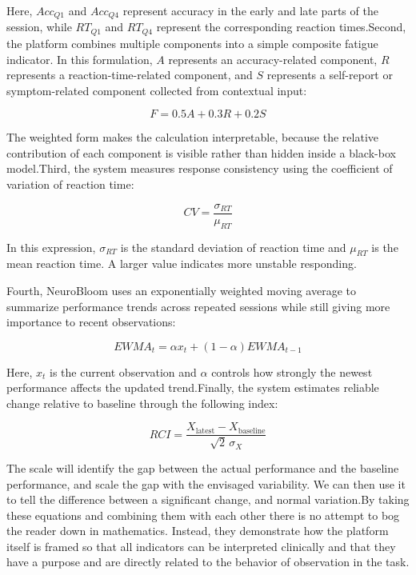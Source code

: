 \documentclass[12pt,a4paper]{report}
\begin{document}
Here, $Acc_{Q1}$ and $Acc_{Q4}$ represent accuracy in the early and late parts of the session, while $RT_{Q1}$ and $RT_{Q4}$ represent the corresponding reaction times.Second, the platform combines multiple components into a simple composite fatigue indicator. In this formulation, $A$ represents an accuracy-related component, $R$ represents a reaction-time-related component, and $S$ represents a self-report or symptom-related component collected from contextual input:

\begin{equation}
F = 0.5A + 0.3R + 0.2S
\end{equation}

The weighted form makes the calculation interpretable, because the relative contribution of each component is visible rather than hidden inside a black-box model.Third, the system measures response consistency using the coefficient of variation of reaction time:

\begin{equation}
CV = \frac{\sigma_{RT}}{\mu_{RT}}
\end{equation}

In this expression, $\sigma_{RT}$ is the standard deviation of reaction time and $\mu_{RT}$ is the mean reaction time. A larger value indicates more unstable responding.

Fourth, NeuroBloom uses an exponentially weighted moving average to summarize performance trends across repeated sessions while still giving more importance to recent observations:

\begin{equation}
EWMA_t = \alpha x_t + (1-\alpha)EWMA_{t-1}
\end{equation}

Here, $x_t$ is the current observation and $\alpha$ controls how strongly the newest performance affects the updated trend.Finally, the system estimates reliable change relative to baseline through the following index:

\begin{equation}
RCI = \frac{X_{\mathrm{latest}} - X_{\mathrm{baseline}}}{\sqrt{2}\,\sigma_X}
\end{equation}

The scale will identify the gap between the actual performance and the baseline performance, and scale the gap with the envisaged variability. We can then use it to tell the difference between a significant change, and normal variation.By taking these equations and combining them with each other there is no attempt to bog the reader down in mathematics. Instead, they demonstrate how the platform itself is framed so that all indicators can be interpreted clinically and that they have a purpose and are directly related to the behavior of observation in the task.
\end{document}
